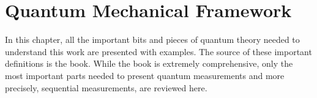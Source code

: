 \documentclass[a4paper,12pt]{wihuri}
\theoremstyle{definition}
\numberwithin{definition}{section}
\numberwithin{example}{section}
\numberwithin{theorem}{section}
\numberwithin{proposition}{section}
\numberwithin{lemma}{section}
\begin{document}
\newpage

\section{Quantum Mechanical Framework}

In this chapter, all the important bits and pieces of quantum theory needed to understand this work are presented with examples. The source of these important definitions is the book\cite{heinosaari_ziman_2011_book}. While the book is extremely comprehensive, only the most important parts needed to present quantum measurements and more precisely, sequential measurements, are reviewed here.
\end{document}

